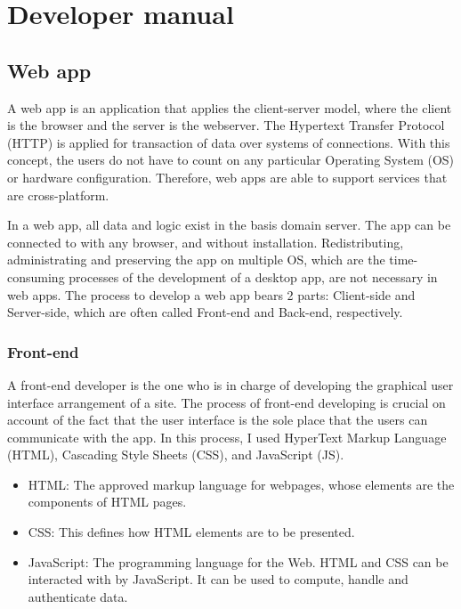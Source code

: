 \documentclass[a4paper, 11pt,openany]{book} %
\begin{document}
\chapter{Developer manual}
\section{Web app}
A web app is an application that applies the client-server model, where the client is the browser and the server is the webserver. The Hypertext Transfer Protocol (HTTP) is applied for transaction of data over systems of connections. With this concept, the users do not have to count on any particular Operating System (OS) or hardware configuration. Therefore, web apps are able to support services that are cross-platform.\par
In a web app, all data and logic exist in the basis domain server. The app can be connected to with any browser, and without installation. Redistributing, administrating and preserving the app on multiple OS, which are the time-consuming processes of the development of a desktop app, are not necessary in web apps. The process to develop a web app bears 2 parts: Client-side and Server-side, which are often called Front-end and Back-end, respectively.

\subsection{Front-end}
A front-end developer is the one who is in charge of developing the graphical user interface arrangement of a site. The process of front-end developing is crucial on account of the fact that the user interface is the sole place that the users can communicate with the app. In this process, I used
HyperText Markup Language (HTML), Cascading Style Sheets (CSS), and JavaScript (JS).\par

\begin{itemize}
    \item HTML: The approved markup language for webpages, whose elements  are the components of HTML pages.\cite{html}
    \item CSS: This defines how HTML elements are to be presented. \cite{css}
    \item JavaScript: The programming language for the Web. HTML and CSS can be interacted with by JavaScript. It can be used to compute, handle and authenticate data. \cite{js}
\end{itemize}
\end{document}

